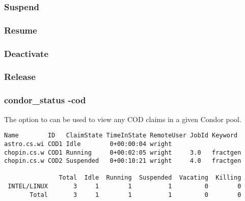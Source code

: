\Todo


\subsubsection{\label{sec:cod-claim-suspend}Suspend}

\Todo


\subsubsection{\label{sec:cod-claim-resume}Resume}

\Todo



\subsubsection{\label{sec:cod-claim-deactivate}Deactivate}

\Todo


\subsubsection{\label{sec:cod-claim-release}Release}

\Todo


\subsubsection{\label{sec:cod-claim-release}condor\_status -cod}

The  option to  can be used to view any COD
claims in a given Condor pool.  

\begin{verbatim}
Name        ID   ClaimState TimeInState RemoteUser JobId Keyword 
astro.cs.wi COD1 Idle        0+00:00:04 wright                   
chopin.cs.w COD1 Running     0+00:02:05 wright     3.0   fractgen
chopin.cs.w COD2 Suspended   0+00:10:21 wright     4.0   fractgen

               Total  Idle  Running  Suspended  Vacating  Killing
 INTEL/LINUX       3     1        1          1         0        0
       Total       3     1        1          1         0        0
\end{verbatim}

